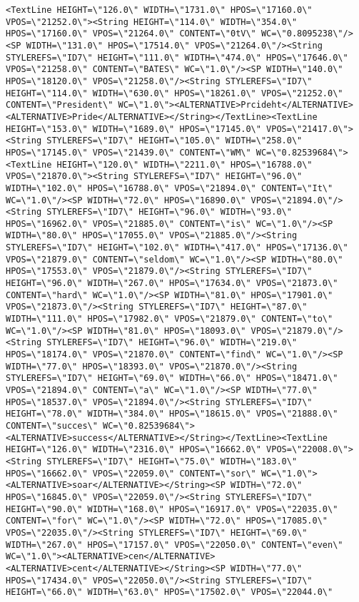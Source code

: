 \documentclass[
]{article}
\begin{document}
\begin{verbatim}
<TextLine HEIGHT=\"126.0\" WIDTH=\"1731.0\" HPOS=\"17160.0\" VPOS=\"21252.0\"><String HEIGHT=\"114.0\" WIDTH=\"354.0\" HPOS=\"17160.0\" VPOS=\"21264.0\" CONTENT=\"0tV\" WC=\"0.8095238\"/><SP WIDTH=\"131.0\" HPOS=\"17514.0\" VPOS=\"21264.0\"/><String STYLEREFS=\"ID7\" HEIGHT=\"111.0\" WIDTH=\"474.0\" HPOS=\"17646.0\" VPOS=\"21258.0\" CONTENT=\"BATES\" WC=\"1.0\"/><SP WIDTH=\"140.0\" HPOS=\"18120.0\" VPOS=\"21258.0\"/><String STYLEREFS=\"ID7\" HEIGHT=\"114.0\" WIDTH=\"630.0\" HPOS=\"18261.0\" VPOS=\"21252.0\" CONTENT=\"President\" WC=\"1.0\"><ALTERNATIVE>Prcideht</ALTERNATIVE><ALTERNATIVE>Pride</ALTERNATIVE></String></TextLine><TextLine HEIGHT=\"153.0\" WIDTH=\"1689.0\" HPOS=\"17145.0\" VPOS=\"21417.0\"><String STYLEREFS=\"ID7\" HEIGHT=\"105.0\" WIDTH=\"258.0\" HPOS=\"17145.0\" VPOS=\"21439.0\" CONTENT=\"WM\" WC=\"0.82539684\"><TextLine HEIGHT=\"120.0\" WIDTH=\"2211.0\" HPOS=\"16788.0\" VPOS=\"21870.0\"><String STYLEREFS=\"ID7\" HEIGHT=\"96.0\" WIDTH=\"102.0\" HPOS=\"16788.0\" VPOS=\"21894.0\" CONTENT=\"It\" WC=\"1.0\"/><SP WIDTH=\"72.0\" HPOS=\"16890.0\" VPOS=\"21894.0\"/><String STYLEREFS=\"ID7\" HEIGHT=\"96.0\" WIDTH=\"93.0\" HPOS=\"16962.0\" VPOS=\"21885.0\" CONTENT=\"is\" WC=\"1.0\"/><SP WIDTH=\"80.0\" HPOS=\"17055.0\" VPOS=\"21885.0\"/><String STYLEREFS=\"ID7\" HEIGHT=\"102.0\" WIDTH=\"417.0\" HPOS=\"17136.0\" VPOS=\"21879.0\" CONTENT=\"seldom\" WC=\"1.0\"/><SP WIDTH=\"80.0\" HPOS=\"17553.0\" VPOS=\"21879.0\"/><String STYLEREFS=\"ID7\" HEIGHT=\"96.0\" WIDTH=\"267.0\" HPOS=\"17634.0\" VPOS=\"21873.0\" CONTENT=\"hard\" WC=\"1.0\"/><SP WIDTH=\"81.0\" HPOS=\"17901.0\" VPOS=\"21873.0\"/><String STYLEREFS=\"ID7\" HEIGHT=\"87.0\" WIDTH=\"111.0\" HPOS=\"17982.0\" VPOS=\"21879.0\" CONTENT=\"to\" WC=\"1.0\"/><SP WIDTH=\"81.0\" HPOS=\"18093.0\" VPOS=\"21879.0\"/><String STYLEREFS=\"ID7\" HEIGHT=\"96.0\" WIDTH=\"219.0\" HPOS=\"18174.0\" VPOS=\"21870.0\" CONTENT=\"find\" WC=\"1.0\"/><SP WIDTH=\"77.0\" HPOS=\"18393.0\" VPOS=\"21870.0\"/><String STYLEREFS=\"ID7\" HEIGHT=\"69.0\" WIDTH=\"66.0\" HPOS=\"18471.0\" VPOS=\"21894.0\" CONTENT=\"a\" WC=\"1.0\"/><SP WIDTH=\"77.0\" HPOS=\"18537.0\" VPOS=\"21894.0\"/><String STYLEREFS=\"ID7\" HEIGHT=\"78.0\" WIDTH=\"384.0\" HPOS=\"18615.0\" VPOS=\"21888.0\" CONTENT=\"succes\" WC=\"0.82539684\"><ALTERNATIVE>success</ALTERNATIVE></String></TextLine><TextLine HEIGHT=\"126.0\" WIDTH=\"2316.0\" HPOS=\"16662.0\" VPOS=\"22008.0\"><String STYLEREFS=\"ID7\" HEIGHT=\"75.0\" WIDTH=\"183.0\" HPOS=\"16662.0\" VPOS=\"22059.0\" CONTENT=\"sor\" WC=\"1.0\"><ALTERNATIVE>soar</ALTERNATIVE></String><SP WIDTH=\"72.0\" HPOS=\"16845.0\" VPOS=\"22059.0\"/><String STYLEREFS=\"ID7\" HEIGHT=\"90.0\" WIDTH=\"168.0\" HPOS=\"16917.0\" VPOS=\"22035.0\" CONTENT=\"for\" WC=\"1.0\"/><SP WIDTH=\"72.0\" HPOS=\"17085.0\" VPOS=\"22035.0\"/><String STYLEREFS=\"ID7\" HEIGHT=\"69.0\" WIDTH=\"267.0\" HPOS=\"17157.0\" VPOS=\"22050.0\" CONTENT=\"even\" WC=\"1.0\"><ALTERNATIVE>cen</ALTERNATIVE><ALTERNATIVE>cent</ALTERNATIVE></String><SP WIDTH=\"77.0\" HPOS=\"17434.0\" VPOS=\"22050.0\"/><String STYLEREFS=\"ID7\" HEIGHT=\"66.0\" WIDTH=\"63.0\" HPOS=\"17502.0\" VPOS=\"22044.0\"
\end{verbatim}
\end{document}
